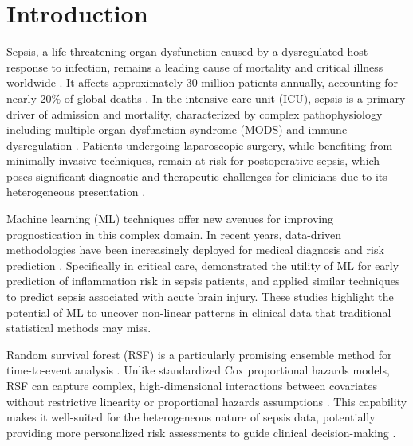 \documentclass[pdflatex,sn-mathphys-num]{sn-jnl}%
\theoremstyle{thmstyleone}%
\theoremstyle{thmstyletwo}%
\theoremstyle{thmstylethree}%
\begin{document}



\maketitle

\section{Introduction}\label{sec1}

Sepsis, a life-threatening organ dysfunction caused by a dysregulated host response to infection, remains a leading cause of mortality and critical illness worldwide \cite{kgyawali2019, awkirkpatrick2023}. It affects approximately 30 million patients annually, accounting for nearly 20\% of global deaths \cite{lzhang2022, pliaw2019, kerudd2017}. In the intensive care unit (ICU), sepsis is a primary driver of admission and mortality, characterized by complex pathophysiology including multiple organ dysfunction syndrome (MODS) and immune dysregulation \cite{gpdobson2024}. Patients undergoing laparoscopic surgery, while benefiting from minimally invasive techniques, remain at risk for postoperative sepsis, which poses significant diagnostic and therapeutic challenges for clinicians due to its heterogeneous presentation \cite{yang2024}.

Machine learning (ML) techniques offer new avenues for improving prognostication in this complex domain. In recent years, data-driven methodologies have been increasingly deployed for medical diagnosis and risk prediction \cite{wttran2019, gnir2019}. Specifically in critical care, \cite{gzhang2024} demonstrated the utility of ML for early prediction of inflammation risk in sepsis patients, and \cite{cge2022} applied similar techniques to predict sepsis associated with acute brain injury. These studies highlight the potential of ML to uncover non-linear patterns in clinical data that traditional statistical methods may miss.

Random survival forest (RSF) is a particularly promising ensemble method for time-to-event analysis \cite{wjwiersinga2022}. Unlike standardized Cox proportional hazards models, RSF can capture complex, high-dimensional interactions between covariates without restrictive linearity or proportional hazards assumptions \cite{rezaei2020}. This capability makes it well-suited for the heterogeneous nature of sepsis data, potentially providing more personalized risk assessments to guide clinical decision-making \cite{bgeorge2014}.
\end{document}
